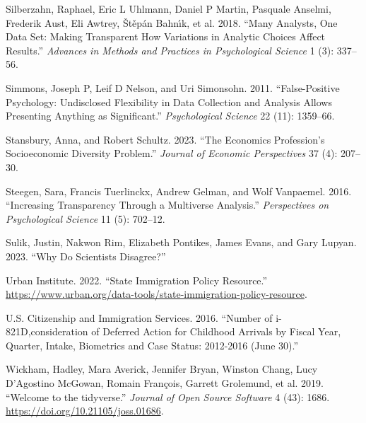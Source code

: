 \documentclass[
  letterpaper,
  DIV=11,
  numbers=noendperiod]{scrartcl}
\newlength{\cslhangindent}
\newlength{\cslentryspacingunit} %
\newenvironment{CSLReferences}[2] %
 {%
  \setlength{\parindent}{0pt}
  \ifodd #1
  \let\oldpar\par
  \def\par{\hangindent=\cslhangindent\oldpar}
  \fi
  \setlength{\parskip}{#2\cslentryspacingunit}
 }%
 {}
\begin{document}
\begin{CSLReferences}{1}{0}
\leavevmode{}%
Silberzahn, Raphael, Eric L Uhlmann, Daniel P Martin, Pasquale Anselmi,
Frederik Aust, Eli Awtrey, Štěpán Bahnı́k, et al. 2018. {``Many Analysts,
One Data Set: Making Transparent How Variations in Analytic Choices
Affect Results.''} \emph{Advances in Methods and Practices in
Psychological Science} 1 (3): 337--56.

\leavevmode{}%
Simmons, Joseph P, Leif D Nelson, and Uri Simonsohn. 2011.
{``False-Positive Psychology: Undisclosed Flexibility in Data Collection
and Analysis Allows Presenting Anything as Significant.''}
\emph{Psychological Science} 22 (11): 1359--66.

\leavevmode{}%
Stansbury, Anna, and Robert Schultz. 2023. {``The Economics Profession's
Socioeconomic Diversity Problem.''} \emph{Journal of Economic
Perspectives} 37 (4): 207--30.

\leavevmode{}%
Steegen, Sara, Francis Tuerlinckx, Andrew Gelman, and Wolf Vanpaemel.
2016. {``Increasing Transparency Through a Multiverse Analysis.''}
\emph{Perspectives on Psychological Science} 11 (5): 702--12.

\leavevmode{}%
Sulik, Justin, Nakwon Rim, Elizabeth Pontikes, James Evans, and Gary
Lupyan. 2023. {``Why Do Scientists Disagree?''}

\leavevmode{}%
Urban Institute. 2022. {``State Immigration Policy Resource.''}
\url{https://www.urban.org/data-tools/state-immigration-policy-resource}.

\leavevmode{}%
U.S. Citizenship and Immigration Services. 2016. {``Number of
i-821D,consideration of Deferred Action for Childhood Arrivals by Fiscal
Year, Quarter, Intake, Biometrics and Case Status: 2012-2016 (June
30).''}

\leavevmode{}%
Wickham, Hadley, Mara Averick, Jennifer Bryan, Winston Chang, Lucy
D'Agostino McGowan, Romain François, Garrett Grolemund, et al. 2019.
{``Welcome to the {tidyverse}.''} \emph{Journal of Open Source Software}
4 (43): 1686. \url{https://doi.org/10.21105/joss.01686}.

\end{CSLReferences}

\FloatBarrier
\end{document}
